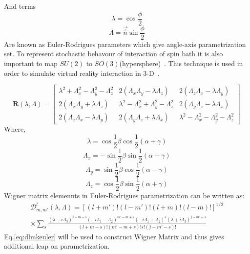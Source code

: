 And terms 
\begin{equation}\label{eq:191}
\lambda=\cos\frac{\phi}{2}
\end{equation}
\begin{equation}\label{eq:191}
\Lambda=\vec{\hat{n}}\sin\frac{\phi}{2}
\end{equation}
Are known as Euler-Rodrigues parameters which give angle-axis parametrization set. To represent stochastic behavour of interaction of spin bath it is also important to map $SU(2)$ to $SO(3)$(hypersphere)~\cite{simon}. This technique is used in order to simulate virtual reality interaction in 3-D~\cite{gorsh}.  

\begin{equation}\label{eq:rquatern}
\textbf{R}(\lambda,\Lambda) = \begin{bmatrix}
       \lambda^2+\Lambda_x^2-\Lambda_y^2-\Lambda_z^2 & 2(\Lambda_x\Lambda_y-\lambda\Lambda_z)  & 2(\Lambda_z\Lambda_x-\lambda\Lambda_y)        \\[0.3em]
       2(\Lambda_x\Lambda_y+\lambda\Lambda_z) & \lambda^2-\Lambda_x^2+\Lambda_y^2-\Lambda_z^2 & 2(\Lambda_y\Lambda_z-\lambda\Lambda_x)  \\[0.3em]
        2(\Lambda_z\Lambda_x-\lambda\Lambda_y)& 2(\Lambda_y\Lambda_z+\lambda\Lambda_x) & \lambda^2-\Lambda_x^2-\Lambda_y^2-\Lambda_z^2
     \end{bmatrix}     
\end{equation}
Where,
\begin{equation}\label{eq:191}
\lambda=\cos\frac{1}{2}\beta\cos\frac{1}{2}(\alpha+\gamma)
\end{equation}
\begin{equation}\label{eq:192}
\Lambda_x=-\sin\frac{1}{2}\beta\sin\frac{1}{2}(\alpha-\gamma)
\end{equation}
\begin{equation}\label{eq:193}
\Lambda_y=\sin\frac{1}{2}\beta\cos\frac{1}{2}(\alpha-\gamma)
\end{equation}
\begin{equation}\label{eq:194}
\Lambda_z=\cos\frac{1}{2}\beta\sin\frac{1}{2}(\alpha+\gamma)
\end{equation}
Wigner matrix elemennts in Euler-Rodrigues parametrization can be written as:
\begin{multline}\label{eq:dlmkeuler}
\mathcal{D}_{m,m'}^l(\lambda,\Lambda)=[(l+m')!(l-m')!(l+m)!(l-m)!]^{1/2}\\ \times \sum_s \frac{(\lambda-i\Lambda_3)^{j+m-s}(-i\Lambda_1-\Lambda_2)^{m'-m+s}(-i\Lambda_1+\Lambda_2)^{s}(\lambda+i\Lambda_3)^{j-m'-s}}{(l+m-s)!(m'-m+s)!s!(j-m'-s)!}
\end{multline}
Eq.\eqref{eq:dlmkeuler} will be used to construct Wigner Matrix and thus gives additional leap on parametrization. 
\clearpage
